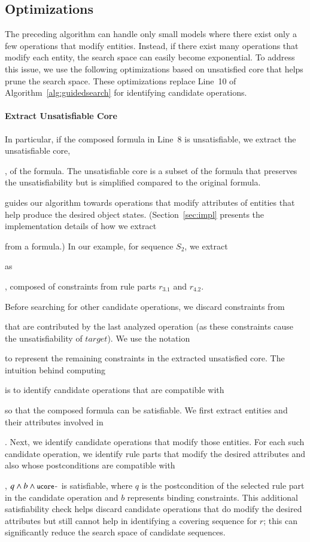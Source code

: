 \subsection{Optimizations}
\label{sec:optimization}

The preceding algorithm can handle only small models where there exist only
a few operations that modify entities. Instead, if there exist many operations 
that modify each entity, the search space can easily become exponential. To
address this issue, we use the following optimizations based on unsatisfied core 
that helps prune the search space. These optimizations replace Line~10
of Algorithm~\ref{alg:guidedsearch} for identifying candidate operations.

\paragraph*{Extract Unsatisfiable Core} In particular, if the composed formula in
Line~8 is unsatisfiable, we extract the unsatisfiable core, \subject{ucore},
of the formula. The unsatisfiable core is a subset of the formula that preserves
the unsatisfiability but is simplified compared to the original formula.
\subject{ucore} guides our algorithm towards operations that modify
attributes of entities that help produce the desired object
states. (Section~\ref{sec:impl} presents the implementation details of how we
extract \subject{ucore} from a formula.) In our example, for sequence $S_2$, 
we extract \subject{ucore} as \subject{ord.total =
  0 $\wedge$ ord.total > 0}, composed of constraints from rule parts $r_{3.1}$
and $r_{4.2}$.

Before searching for other candidate operations, we discard
constraints from \subject{ucore} that are contributed by the last analyzed
operation (as these constraints cause the unsatisfiability of $target$).  We use
the notation \subject{ucore-} to represent the remaining constraints in the
extracted unsatisfied core. The intuition behind computing \subject{ucore-} is
to identify candidate operations that are compatible with \subject{ucore-} so
that the composed formula can be satisfiable. We first extract
entities and their attributes involved in \subject{ucore-}. Next, we identify
candidate operations that modify those entities.  For each such candidate
operation, we identify rule parts that modify the desired attributes and also
whose postconditions are compatible with \subject{ucore-}, \ie{} $q \wedge b
\wedge \subject{ucore-}$ is satisfiable, where $q$ is the postcondition of the
selected rule part in the candidate operation and $b$ represents binding
constraints.  This additional satisfiability check helps discard candidate
operations that do modify the desired attributes but still cannot help in
identifying a covering sequence for $r$; this can significantly reduce the
search space of candidate sequences.

